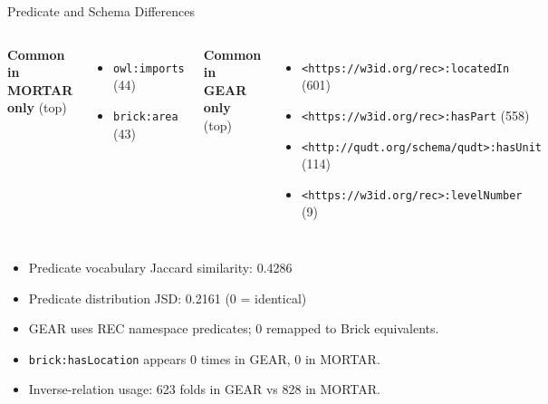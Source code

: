 \documentclass[10pt]{beamer}
\begin{document}
\begin{frame}{Predicate and Schema Differences}
  \begin{columns}[t]
    \textbf{Common in MORTAR only} (top)\par
    \vspace{0.3em}
    \begin{itemize}
      \item \texttt{owl:imports} (44)
      \item \texttt{brick:area} (43)
    \end{itemize}
    \textbf{Common in GEAR only} (top)\par
    \vspace{0.3em}
    \begin{itemize}
      \item \texttt{\textless{}https://w3id.org/rec\textgreater{}:locatedIn} (601)
      \item \texttt{\textless{}https://w3id.org/rec\textgreater{}:hasPart} (558)
      \item \texttt{\textless{}http://qudt.org/schema/qudt\textgreater{}:hasUnit} (114)
      \item \texttt{\textless{}https://w3id.org/rec\textgreater{}:levelNumber} (9)
    \end{itemize}
  \end{columns}
  \vspace{0.5em}
  \begin{itemize}
    \item Predicate vocabulary Jaccard similarity: 0.4286
    \item Predicate distribution JSD: 0.2161 (0 = identical)
    \item GEAR uses REC namespace predicates; 0 remapped to Brick equivalents.
    \item \texttt{brick:hasLocation} appears 0 times in GEAR, 0 in MORTAR.
    \item Inverse-relation usage: 623 folds in GEAR vs 828 in MORTAR.
  \end{itemize}
\end{frame}
\end{document}
